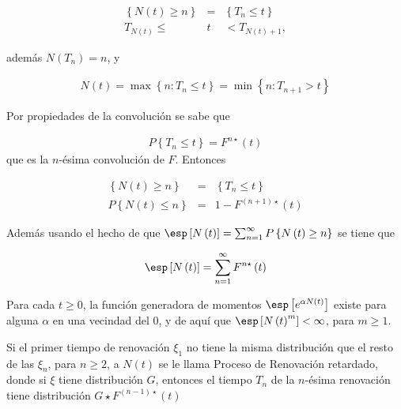 \begin{eqnarray*}
\left\{N\left(t\right)\geq n\right\}&=&\left\{T_{n}\leq t\right\}\\
T_{N\left(t\right)}\leq &t&<T_{N\left(t\right)+1},
\end{eqnarray*}

adem\'as $N\left(T_{n}\right)=n$, y 

\begin{eqnarray*}
N\left(t\right)=\max\left\{n:T_{n}\leq t\right\}=\min\left\{n:T_{n+1}>t\right\}
\end{eqnarray*}

Por propiedades de la convoluci\'on se sabe que

\begin{eqnarray*}
P\left\{T_{n}\leq t\right\}=F^{n\star}\left(t\right)
\end{eqnarray*}
que es la $n$-\'esima convoluci\'on de $F$. Entonces 

\begin{eqnarray*}
\left\{N\left(t\right)\geq n\right\}&=&\left\{T_{n}\leq t\right\}\\
P\left\{N\left(t\right)\leq n\right\}&=&1-F^{\left(n+1\right)\star}\left(t\right)
\end{eqnarray*}

Adem\'as usando el hecho de que $\esp\left[N\left(t\right)\right]=\sum_{n=1}^{\infty}P\left\{N\left(t\right)\geq n\right\}$
se tiene que

\begin{eqnarray*}
\esp\left[N\left(t\right)\right]=\sum_{n=1}^{\infty}F^{n\star}\left(t\right)
\end{eqnarray*}

\begin{Prop}
Para cada $t\geq0$, la funci\'on generadora de momentos $\esp\left[e^{\alpha N\left(t\right)}\right]$ existe para alguna $\alpha$ en una vecindad del 0, y de aqu\'i que $\esp\left[N\left(t\right)^{m}\right]<\infty$, para $m\geq1$.
\end{Prop}


\begin{Note}
Si el primer tiempo de renovaci\'on $\xi_{1}$ no tiene la misma distribuci\'on que el resto de las $\xi_{n}$, para $n\geq2$, a $N\left(t\right)$ se le llama Proceso de Renovaci\'on retardado, donde si $\xi$ tiene distribuci\'on $G$, entonces el tiempo $T_{n}$ de la $n$-\'esima renovaci\'on tiene distribuci\'on $G\star F^{\left(n-1\right)\star}\left(t\right)$
\end{Note}


